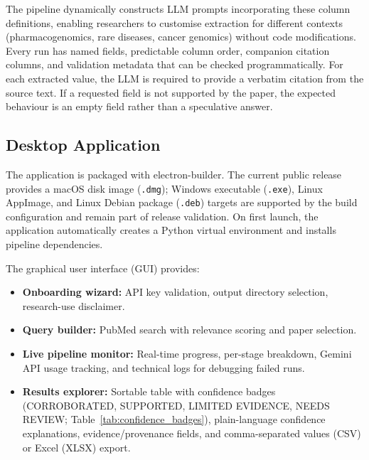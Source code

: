 The pipeline dynamically constructs LLM prompts incorporating these column definitions, enabling researchers to customise extraction for different contexts (pharmacogenomics, rare diseases, cancer genomics) without code modifications. Every run has named fields, predictable column order, companion citation columns, and validation metadata that can be checked programmatically. For each extracted value, the LLM is required to provide a verbatim citation from the source text. If a requested field is not supported by the paper, the expected behaviour is an empty field rather than a speculative answer.

\subsection{Desktop Application}
\label{subsec:desktop}

The application is packaged with electron-builder. The current public release provides a macOS disk image (\texttt{.dmg}); Windows executable (\texttt{.exe}), Linux AppImage, and Linux Debian package (\texttt{.deb}) targets are supported by the build configuration and remain part of release validation. On first launch, the application automatically creates a Python virtual environment and installs pipeline dependencies.

The graphical user interface (GUI) provides:
\begin{itemize}[itemsep=1pt]
    \item \textbf{Onboarding wizard:} API key validation, output directory selection, research-use disclaimer.
    \item \textbf{Query builder:} PubMed search with relevance scoring and paper selection.
    \item \textbf{Live pipeline monitor:} Real-time progress, per-stage breakdown, Gemini API usage tracking, and technical logs for debugging failed runs.
    \item \textbf{Results explorer:} Sortable table with confidence badges (CORROBORATED, SUPPORTED, LIMITED EVIDENCE, NEEDS REVIEW; Table~\ref{tab:confidence_badges}), plain-language confidence explanations, evidence/provenance fields, and comma-separated values (CSV) or Excel (XLSX) export.
\end{itemize}

